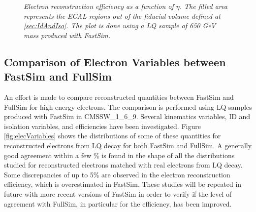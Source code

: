 \documentclass[colclass=cmspaper]{combine}
\begin{document}
\begin{linenumbers}
\begin{figure}
  \begin{center}
    \caption{\small \sl Electron reconstruction efficiency as a function of $\eta$. The filled area represents the  
      ECAL regions out of the fiducial volume defined at \ref{sec:IdAndIso}. The plot is done using a 
      LQ sample of 650 GeV mass produced with FastSim.}
    \label{fig:elecEffFV}
  \end{center}
\end{figure}


\subsection{Comparison of Electron Variables between FastSim and FullSim} \label{sec:elecFastSimCompare}
An effort is made to compare reconstructed quantities between FastSim and FullSim for high energy electrons.
The comparison is performed using LQ samples produced with FastSim in CMSSW\_1\_6\_9. 
Several kinematics variables, ID and isolation variables, and efficiencies have been investigated. 
Figure \ref{fig:elecVariables} shows the distributions of some of these quantities for reconstructed electrons from LQ decay 
for both FastSim and FullSim.
A generally good agreement within a few \% is found in the shape of all the distributions studied for reconstructed electrons matched 
with real electrons from LQ decay. Some discrepancies of up to 5\% are observed in the electron 
reconstruction efficiency,  which is overestimated in FastSim. 
These studies will be repeated in future with more recent versions of FastSim in order to verify if the level 
of agreement with FullSim, in particular for the efficiency, has been improved. 


\end{linenumbers}
\end{document}
